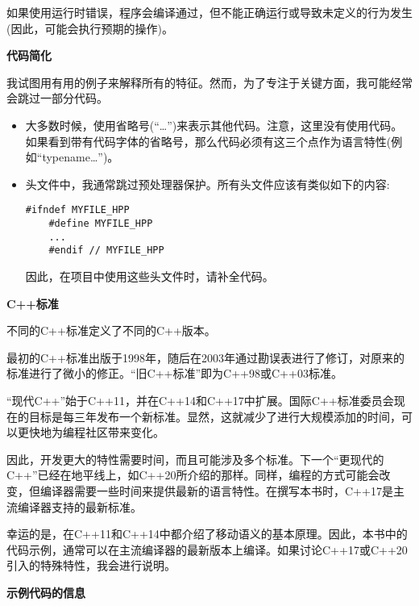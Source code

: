 如果使用运行时错误，程序会编译通过，但不能正确运行或导致未定义的行为发生(因此，可能会执行预期的操作)。\par

\hspace*{\fill} \par %
\textbf{代码简化}

我试图用有用的例子来解释所有的特征。然而，为了专注于关键方面，我可能经常会跳过一部分代码。\par

\begin{itemize}
	\item 大多数时候，使用省略号(“…”)来表示其他代码。注意，这里没有使用代码。如果看到带有代码字体的省略号，那么代码必须有这三个点作为语言特性(例如“typename…”)。
	\item 头文件中，我通常跳过预处理器保护。所有头文件应该有类似如下的内容:
	\begin{lstlisting}[caption={}]
	#ifndef MYFILE_HPP
	#define MYFILE_HPP
	...
	#endif // MYFILE_HPP
	\end{lstlisting}
	因此，在项目中使用这些头文件时，请补全代码。
\end{itemize}

\hspace*{\fill} \par %
\textbf{C++标准}

不同的C++标准定义了不同的C++版本。\par

最初的C++标准出版于1998年，随后在2003年通过勘误表进行了修订，对原来的标准进行了微小的修正。“旧C++标准”即为C++98或C++03标准。\par

“现代C++”始于C++11，并在C++14和C++17中扩展。国际C++标准委员会现在的目标是每三年发布一个新标准。显然，这就减少了进行大规模添加的时间，可以更快地为编程社区带来变化。\par

因此，开发更大的特性需要时间，而且可能涉及多个标准。下一个“更现代的C++”已经在地平线上，如C++20所介绍的那样。同样，编程的方式可能会改变，但编译器需要一些时间来提供最新的语言特性。在撰写本书时，C++17是主流编译器支持的最新标准。\par

幸运的是，在C++11和C++14中都介绍了移动语义的基本原理。因此，本书中的代码示例，通常可以在主流编译器的最新版本上编译。如果讨论C++17或C++20引入的特殊特性，我会进行说明。\par

\hspace*{\fill} \par %
\textbf{示例代码的信息}

